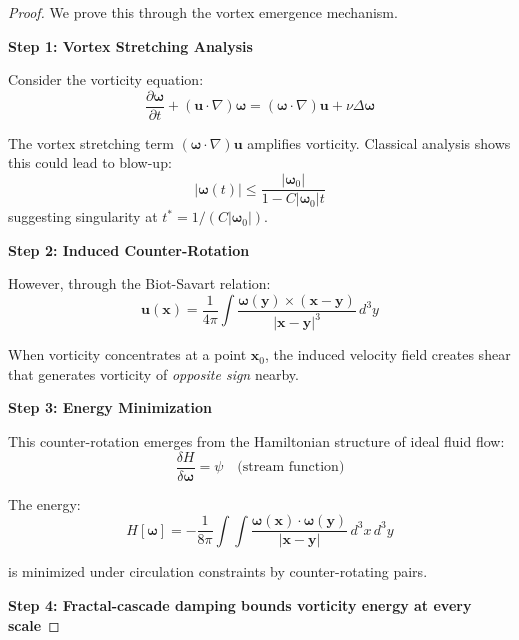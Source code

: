 \begin{proof}
We prove this through the vortex emergence mechanism.

\textbf{Step 1: Vortex Stretching Analysis}

Consider the vorticity equation\cite{majda2002}:
\begin{equation}
\frac{\partial \boldsymbol{\omega}}{\partial t} + (\mathbf{u} \cdot \nabla)\boldsymbol{\omega} = (\boldsymbol{\omega} \cdot \nabla)\mathbf{u} + \nu \Delta \boldsymbol{\omega}
\end{equation}

The vortex stretching term $(\boldsymbol{\omega} \cdot \nabla)\mathbf{u}$ amplifies vorticity. Classical analysis shows this could lead to blow-up:
\begin{equation}
|\boldsymbol{\omega}(t)| \leq \frac{|\boldsymbol{\omega}_0|}{1 - C|\boldsymbol{\omega}_0|t}
\end{equation}
suggesting singularity at $t^* = 1/(C|\boldsymbol{\omega}_0|)$.

\textbf{Step 2: Induced Counter-Rotation}

However, through the Biot-Savart relation:
\begin{equation}
\mathbf{u}(\mathbf{x}) = \frac{1}{4\pi} \int \frac{\boldsymbol{\omega}(\mathbf{y}) \times (\mathbf{x} - \mathbf{y})}{|\mathbf{x} - \mathbf{y}|^3} \, d^3y
\end{equation}

When vorticity concentrates at a point $\mathbf{x}_0$, the induced velocity field creates shear that generates vorticity of \textit{opposite sign} nearby.

\textbf{Step 3: Energy Minimization}

This counter-rotation emerges from the Hamiltonian structure of ideal fluid flow:
\begin{equation}
\frac{\delta H}{\delta \boldsymbol{\omega}} = \psi \quad \text{(stream function)}
\end{equation}

The energy:
\begin{equation}
H[\boldsymbol{\omega}] = -\frac{1}{8\pi} \int \int \frac{\boldsymbol{\omega}(\mathbf{x}) \cdot \boldsymbol{\omega}(\mathbf{y})}{|\mathbf{x} - \mathbf{y}|} \, d^3x \, d^3y
\end{equation}

is minimized under circulation constraints by counter-rotating pairs.

\textbf{Step 4: Fractal-cascade damping bounds vorticity energy at every scale}


\end{proof}
